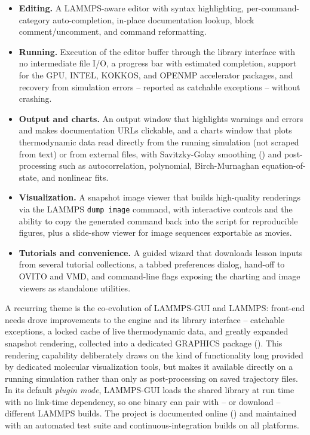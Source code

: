 \documentclass[
]{article}
\providecommand{\tightlist}{%
  \setlength{\itemsep}{0pt}\setlength{\parskip}{0pt}}
\begin{document}
\begin{itemize}
\tightlist
\item
  \textbf{Editing.} A LAMMPS-aware editor with syntax highlighting,
  per-command-category auto-completion, in-place documentation lookup,
  block comment/uncomment, and command reformatting.
\item
  \textbf{Running.} Execution of the editor buffer through the library
  interface with no intermediate file I/O, a progress bar with estimated
  completion, support for the GPU, INTEL, KOKKOS, and OPENMP accelerator
  packages, and recovery from simulation errors -- reported as catchable
  exceptions -- without crashing.
\item
  \textbf{Output and charts.} An output window that highlights warnings
  and errors and makes documentation URLs clickable, and a charts window
  that plots thermodynamic data read directly from the running
  simulation (not scraped from text) or from external files, with
  Savitzky-Golay smoothing () and post-processing such as autocorrelation, polynomial,
  Birch-Murnaghan equation-of-state, and nonlinear fits.
\item
  \textbf{Visualization.} A snapshot image viewer that builds
  high-quality renderings via the LAMMPS \texttt{dump\ image} command,
  with interactive controls and the ability to copy the generated
  command back into the script for reproducible figures, plus a
  slide-show viewer for image sequences exportable as movies.
\item
  \textbf{Tutorials and convenience.} A guided wizard that downloads
  lesson inputs from several tutorial collections, a tabbed preferences
  dialog, hand-off to OVITO and VMD, and command-line flags exposing the
  charting and image viewers as standalone utilities.
\end{itemize}

A recurring theme is the co-evolution of LAMMPS-GUI and LAMMPS:
front-end needs drove improvements to the engine and its library
interface -- catchable exceptions, a locked cache of live thermodynamic
data, and greatly expanded snapshot rendering, collected into a
dedicated GRAPHICS package (). This rendering capability deliberately draws on the
kind of functionality long provided by dedicated molecular visualization
tools, but makes it available directly on a running simulation rather
than only as post-processing on saved trajectory files. In its default
\emph{plugin mode}, LAMMPS-GUI loads the shared library at run time with
no link-time dependency, so one binary can pair with -- or download --
different LAMMPS builds. The project is documented online
() and maintained with an
automated test suite and continuous-integration builds on all platforms.
\end{document}
